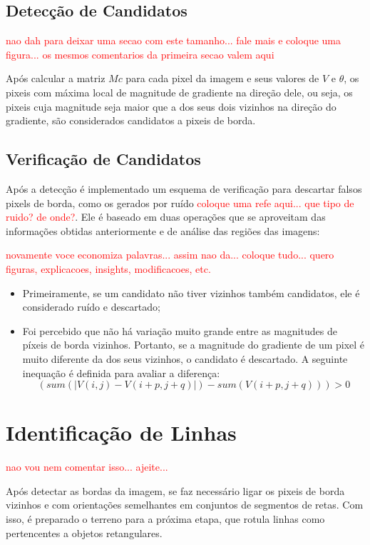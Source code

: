 \subsection{Detecção de Candidatos}

\textcolor{red}{nao dah para deixar uma secao com este tamanho... fale mais e coloque uma figura... os mesmos comentarios da primeira secao valem aqui}

Após calcular a matriz $Mc$ para cada pixel da imagem e seus valores de $V$ e $\theta$, os pixeis com máxima local de magnitude de gradiente na direção dele, ou seja, os pixeis cuja magnitude seja maior que a dos seus dois vizinhos na direção do gradiente, são considerados candidatos a pixeis de borda.

\subsection{Verificação de Candidatos}

Após a detecção é implementado um esquema de verificação para descartar falsos pixels de borda, como os gerados por ruído \textcolor{red}{coloque uma refe aqui... que tipo de ruido? de onde?}. Ele é baseado em duas operações que se aproveitam das informações obtidas anteriormente e de análise das regiões das imagens:

\textcolor{red}{novamente voce economiza palavras... assim nao da... coloque tudo... quero figuras, explicacoes, insights, modificacoes, etc.}

\begin{itemize}
\item Primeiramente, se um candidato não tiver vizinhos também candidatos, ele é considerado ruído e descartado;
\item Foi percebido que não há variação muito grande entre as magnitudes de píxeis de borda vizinhos. Portanto, se a magnitude do gradiente de um pixel é muito diferente da dos seus vizinhos, o candidato é descartado. A seguinte inequação é definida para avaliar a diferença:
$$ (sum(| V(i,j) - V(i+p,j+q) |)- sum(V(i+p,j+q))) >0$$
\end {itemize}

\section{Identificação de Linhas}

\textcolor{red}{nao vou nem comentar isso... ajeite...}

Após detectar as bordas da imagem, se faz necessário ligar os pixeis de borda vizinhos e com orientações semelhantes em conjuntos de segmentos de retas. Com isso, é preparado o terreno para a próxima etapa, que rotula linhas como pertencentes a objetos retangulares. 

